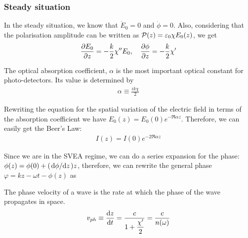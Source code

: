 \subsubsection*{Steady situation}
In the steady situation, we know that $\dot{E}_{0} = 0$ and $\dot{\phi} = 0$. Also, considering that the polarisation amplitude can be written as $\mathcal{P}(z) = \varepsilon_{0} \chi E_{0}(z)$, we get
\begin{align}
	\pdv{E_{0}}{z} = - \frac{k}{2} \chi'' E_{0} \qc \pdv{\phi}{z} = - \frac{k}{2} \chi'
\end{align}

\begin{defi}
	The optical absorption coefficient, $\alpha$ is the most important optical constant
for photo-detectors. Its value is determined by
	\begin{align*}
		\alpha \equiv \frac{i k \chi}{2}
	\end{align*}
\end{defi}

Rewriting the equation for the spatial variation of the electric field in terms of the absorption coefficient we have $E_{0}(z) = E_{0}(0) e^{- \Re{\alpha} z}$. Therefore, we can easily get the Beer's Law:
\begin{align}
	I(z) = I(0) e^{- 2 \Re{\alpha} z}
\end{align}

Since we are in the SVEA regime, we can do a series expansion for the phase: $\phi(z) = \phi(0) + (\dv*{\phi}{z}) z$, therefore, we can rewrite the general phase $\varphi = kz - \omega t - \phi(z)$ as

\begin{defi}
	The phase velocity of a wave is the rate at which the phase of the wave propagates in space.
	\begin{align}
		v_{ph} \equiv \dv{z}{t} = \frac{c}{1 + \dfrac{\chi'}{2}} = \frac{c}{n (\omega)}
	\end{align}
\end{defi}

